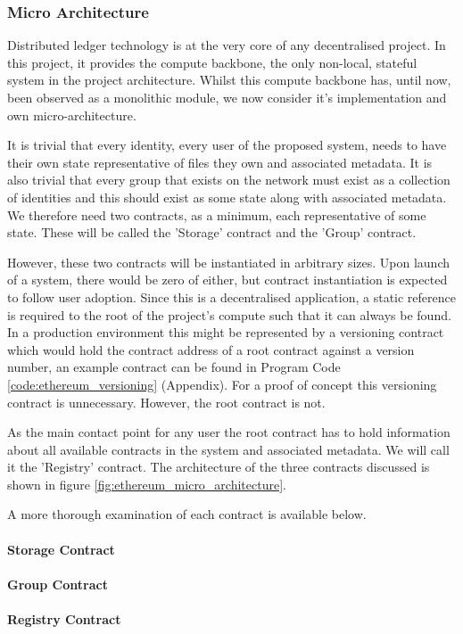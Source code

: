 \subsubsection{Micro Architecture}

Distributed ledger technology is at the very core of any decentralised project. In this project, it provides the compute backbone, the only non-local, stateful system in the project architecture. Whilst this compute backbone has, until now, been observed as a monolithic module, we now consider it's implementation and own micro-architecture.

It is trivial that every identity, every user of the proposed system, needs to have their own state representative of files they own and associated metadata. It is also trivial that every group that exists on the network must exist as a collection of identities and this should exist as some state along with associated metadata. We therefore need two contracts, as a minimum, each representative of some state. These will be called the 'Storage' contract and the 'Group' contract.

However, these two contracts will be instantiated in arbitrary sizes. Upon launch of a system, there would be zero of either, but contract instantiation is expected to follow user adoption. Since this is a decentralised application, a static reference is required to the root of the project's compute such that it can always be found. In a production environment this might be represented by a versioning contract which would hold the contract address of a root contract against a version number, an example contract can be found in Program Code \ref{code:ethereum_versioning} (Appendix). For a proof of concept this versioning contract is unnecessary. However, the root contract is not.

As the main contact point for any user the root contract has to hold information about all available contracts in the system and associated metadata. We will call it the 'Registry' contract. The architecture of the three contracts discussed is shown in figure \ref{fig:ethereum_micro_architecture}.



A more thorough examination of each contract is available below.

\paragraph{Storage Contract}

\paragraph{Group Contract}

\paragraph{Registry Contract}
